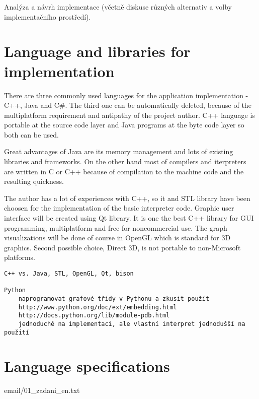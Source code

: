 \documentclass[11pt,twoside,a4paper]{book}
\begin{document}
Analýza a návrh implementace (včetně diskuse různých alternativ a volby im\-ple\-men\-tač\-ní\-ho prostředí).

\section{Language and libraries for implementation}

There are three commonly used languages for the application implementation - C++, Java and C\#. The third one can be automatically deleted, because of the multiplatform requirement and antipathy of the project author. C++ language is portable at the source code layer and Java programs at the byte code layer so both can be used.

Great advantages of Java are its memory management and lots of existing libraries and frameworks. On the other hand most of compilers and iterpreters are written in C or C++ because of compilation to the machine code and the resulting quickness.

The author has a lot of experiences with C++, so it and STL library have been choosen for the implementation of the basic interpreter code. Graphic user interface will be created using Qt library. It is one the best C++ library for GUI programming, multiplatform and free for noncommercial use. The graph visualizations will be done of course in OpenGL which is standard for 3D graphics. Second possible choice, Direct 3D, is not portable to non-Microsoft platforms.

\begin{verbatim}
C++ vs. Java, STL, OpenGL, Qt, bison

Python
	naprogramovat grafové třídy v Pythonu a zkusit použít
	http://www.python.org/doc/ext/embedding.html
	http://docs.python.org/lib/module-pdb.html
	jednoduché na implementaci, ale vlastní interpret jednodušší na použití
\end{verbatim}


\section{Language specifications}

email/01\_zadani\_en.txt
\end{document}
